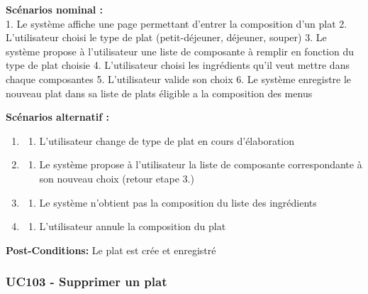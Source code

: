 \textbf{Scénarios nominal :}\\
1. Le système affiche une page permettant d'entrer la composition d'un
plat 2. L'utilisateur choisi le type de plat (petit-déjeuner, déjeuner,
souper) 3. Le système propose à l'utilisateur une liste de composante à
remplir en fonction du type de plat choisie 4. L'utilisateur choisi les
ingrédients qu'il veut mettre dans chaque composantes 5. L'utilisateur
valide son choix 6. Le système enregistre le nouveau plat dans sa liste
de plats éligible a la composition des menus

\textbf{Scénarios alternatif :}

\begin{enumerate}
\def\labelenumi{\arabic{enumi}.}
\setcounter{enumi}{2}
\item
  \begin{enumerate}
  \def\labelenumii{\alph{enumii}.}
  \item
    L'utilisateur change de type de plat en cours d'élaboration\\
  \end{enumerate}
\item
  \begin{enumerate}
  \def\labelenumii{\alph{enumii}.}
  \setcounter{enumii}{1}
  \item
    Le système propose à l'utilisateur la liste de composante
    correspondante à son nouveau choix (retour etape 3.)\\
  \end{enumerate}
\item
  \begin{enumerate}
  \def\labelenumii{\alph{enumii}.}
  \setcounter{enumii}{2}
  \item
    Le système n'obtient pas la composition du liste des ingrédients\\
  \end{enumerate}
\item
  \begin{enumerate}
  \def\labelenumii{\alph{enumii}.}
  \item
    L'utilisateur annule la composition du plat
  \end{enumerate}
\end{enumerate}

\textbf{Post-Conditions:} Le plat est crée et enregistré

\subsubsection{UC103 - Supprimer un
plat}\label{uc103---supprimer-un-plat}

